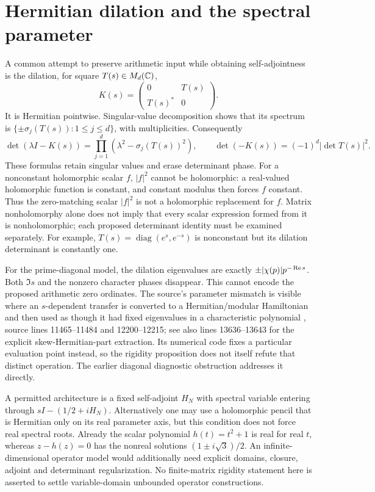 \section{Hermitian dilation and the spectral parameter}
A common attempt to preserve arithmetic input while obtaining self-adjointness
is the dilation, for square $T(s)\in M_d(\mathbb C)$,
\[
 K(s)=\begin{pmatrix}0&T(s)\\T(s)^*&0\end{pmatrix}.
\]
It is Hermitian pointwise. Singular-value decomposition shows that its
spectrum is $\{\pm\sigma_j(T(s)):1\le j\le d\}$, with multiplicities.
Consequently
\[
 \det(\lambda I-K(s))=\prod_{j=1}^d(\lambda^2-\sigma_j(T(s))^2),
 \qquad \det(-K(s))=(-1)^d|\det T(s)|^2.
\]
These formulas retain singular values and erase determinant phase.
For a nonconstant holomorphic scalar $f$, $|f|^2$ cannot be holomorphic:
a real-valued holomorphic function is constant, and constant modulus then
forces $f$ constant. Thus the zero-matching scalar $|f|^2$ is not a
holomorphic replacement for $f$. Matrix nonholomorphy alone does not imply
that every scalar expression formed from it is nonholomorphic; each
proposed determinant identity must be examined separately.
For example, $T(s)=\operatorname{diag}(e^s,e^{-s})$ is nonconstant but its
dilation determinant is constantly one.

For the prime-diagonal model, the dilation eigenvalues are exactly
$\pm|\chi(p)|p^{-\operatorname{Re} s}$. Both $\Im s$ and the nonzero character phases
disappear. This cannot encode the proposed arithmetic zero ordinates.
The source's parameter mismatch is visible where an $s$-dependent
transfer is converted to a Hermitian/modular Hamiltonian and then used as
though it had fixed eigenvalues in a characteristic polynomial
\cite{surface}, source lines 11465--11484 and 12200--12215; see also
lines 13636--13643 for the explicit skew-Hermitian-part extraction.
Its numerical code fixes a particular evaluation point instead, so the
rigidity proposition does not itself refute that distinct operation.
The earlier diagonal diagnostic obstruction addresses it directly.

A permitted architecture is a fixed self-adjoint $H_N$ with spectral
variable entering through $sI-(1/2+iH_N)$. Alternatively one may use a
holomorphic pencil that is Hermitian only on its real parameter axis,
but this condition does not force real spectral roots. Already the
scalar polynomial $h(t)=t^2+1$ is real for real $t$, whereas
$z-h(z)=0$ has the nonreal solutions $(1\pm i\sqrt3)/2$.
An infinite-dimensional operator model would additionally need explicit
domains, closure, adjoint and determinant regularization. No finite-matrix
rigidity statement here is asserted to settle variable-domain unbounded
operator constructions.

